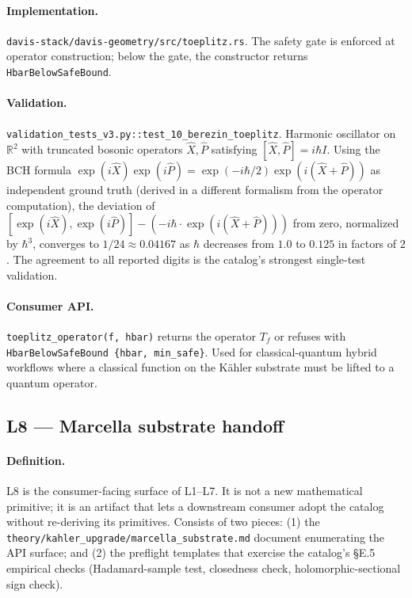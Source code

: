 \documentclass[11pt,letterpaper]{article}
\begin{document}
\paragraph{Implementation.}
\texttt{davis-stack/davis-geometry/src/toeplitz.rs}. The safety
gate is enforced at operator construction; below the gate, the
constructor returns \verb|HbarBelowSafeBound|.

\paragraph{Validation.}
\texttt{validation\_tests\_v3.py::test\_10\_berezin\_toeplitz}.
Harmonic oscillator on $\mathbb{R}^2$ with truncated bosonic
operators $\hat X, \hat P$ satisfying $[\hat X, \hat P] = i \hbar I$.
Using the BCH formula
$\exp(i \hat X) \exp(i \hat P) = \exp(-i \hbar / 2) \exp(i(\hat X +
\hat P))$ as independent ground truth (derived in a different
formalism from the operator computation), the deviation of
$[\exp(i \hat X), \exp(i \hat P)] - (-i \hbar \cdot \exp(i(\hat X +
\hat P)))$ from zero, normalized by $\hbar^3$, converges to
$1/24 \approx 0.04167$ as $\hbar$ decreases from $1.0$ to $0.125$
in factors of $2$. The agreement to all reported digits is the
catalog's strongest single-test validation.

\paragraph{Consumer API.}
\texttt{toeplitz\_operator(f, hbar)} returns the operator $T_f$ or
refuses with \texttt{HbarBelowSafeBound \{hbar, min\_safe\}}. Used
for classical-quantum hybrid workflows where a classical function on
the K\"ahler substrate must be lifted to a quantum operator.


\subsection{L8 --- Marcella substrate handoff}

\paragraph{Definition.}
L8 is the consumer-facing surface of L1--L7. It is not a new
mathematical primitive; it is an artifact that lets a downstream
consumer adopt the catalog without re-deriving its primitives.
Consists of two pieces: (1) the
\texttt{theory/kahler\_upgrade/marcella\_substrate.md} document
enumerating the API surface; and (2) the preflight templates that
exercise the catalog's \S E.5 empirical checks
(Hadamard-sample test, closedness check, holomorphic-sectional
sign check).
\end{document}
